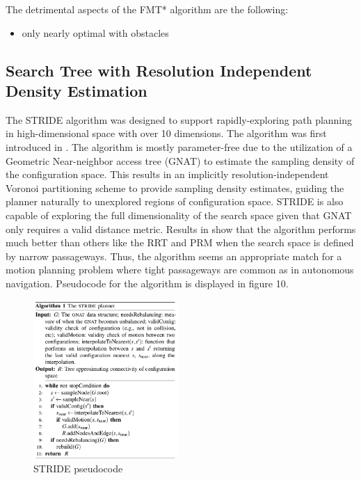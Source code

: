 \documentclass[conference]{IEEEtran} \usepackage[T1]{fontenc} \usepackage[backend=biber, style=ieee]{biblatex}
\begin{document}
The detrimental aspects of the FMT* algorithm are the following:
\begin{itemize}
 \item only nearly optimal with obstacles
\end{itemize}

\subsection{Search Tree with Resolution Independent Density Estimation} \label{STRIDE}
The STRIDE algorithm was designed to support rapidly-exploring path planning in high-dimensional space with over 10 dimensions. The algorithm was first introduced
in \cite{stride}. The algorithm is mostly parameter-free due to the utilization of a Geometric Near-neighbor access tree (GNAT) to estimate the sampling density of the 
configuration space. This results in an implicitly resolution-independent Voronoi partitioning scheme to provide sampling density estimates, guiding the planner 
naturally to unexplored regions of configuration space. STRIDE is also capable of exploring the full dimensionality of the search space given that GNAT only requires a 
valid distance metric. Results in \cite{stride} show that the algorithm performs much better than others like the RRT and PRM when the search space is defined
by narrow passageways. Thus, the algorithm seems an appropriate match for a motion planning problem where tight passageways are common as in autonomous navigation.
Pseudocode for the algorithm is displayed in figure 10.

\begin{figure}
\label{figure10} 
\centering 
\includegraphics[width=0.49\textwidth]{stride}
\caption{STRIDE pseudocode}
\end{figure}
\end{document}
